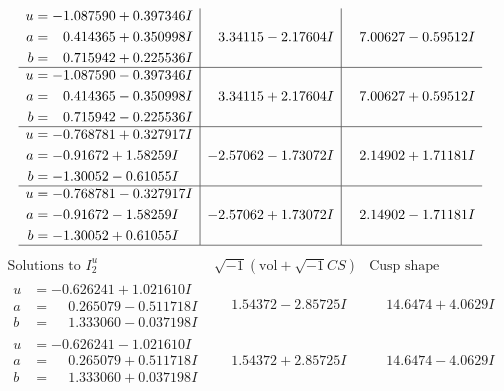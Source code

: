 \documentclass[1p]{elsarticle_modified}
\theoremstyle{definition}
\newcommand{\I}{\sqrt{-1}}
\begin{document}
$$\begin{array}{c|c|c}
\begin{aligned}
u &= -1.087590 + 0.397346 I \\
a &= \phantom{-}0.414365 + 0.350998 I \\
b &= \phantom{-}0.715942 + 0.225536 I\end{aligned}
 & \phantom{-}3.34115 - 2.17604 I & \phantom{-}7.00627 - 0.59512 I \\ \hline\begin{aligned}
u &= -1.087590 - 0.397346 I \\
a &= \phantom{-}0.414365 - 0.350998 I \\
b &= \phantom{-}0.715942 - 0.225536 I\end{aligned}
 & \phantom{-}3.34115 + 2.17604 I & \phantom{-}7.00627 + 0.59512 I \\ \hline\begin{aligned}
u &= -0.768781 + 0.327917 I \\
a &= -0.91672 + 1.58259 I \\
b &= -1.30052 - 0.61055 I\end{aligned}
 & -2.57062 - 1.73072 I & \phantom{-}2.14902 + 1.71181 I \\ \hline\begin{aligned}
u &= -0.768781 - 0.327917 I \\
a &= -0.91672 - 1.58259 I \\
b &= -1.30052 + 0.61055 I\end{aligned}
 & -2.57062 + 1.73072 I & \phantom{-}2.14902 - 1.71181 I\\
 \hline 
 \end{array}$$\newpage$$\begin{array}{c|c|c}  
\text{Solutions to }I^u_{2}& \I (\text{vol} + \sqrt{-1}CS) & \text{Cusp shape}\\
 \hline 
\begin{aligned}
u &= -0.626241 + 1.021610 I \\
a &= \phantom{-}0.265079 - 0.511718 I \\
b &= \phantom{-}1.333060 - 0.037198 I\end{aligned}
 & \phantom{-}1.54372 - 2.85725 I & \phantom{-}14.6474 + 4.0629 I \\ \hline\begin{aligned}
u &= -0.626241 - 1.021610 I \\
a &= \phantom{-}0.265079 + 0.511718 I \\
b &= \phantom{-}1.333060 + 0.037198 I\end{aligned}
 & \phantom{-}1.54372 + 2.85725 I & \phantom{-}14.6474 - 4.0629 I \\ \hline\begin{aligned}

\end{aligned}
\end{array}$$
\end{document}
